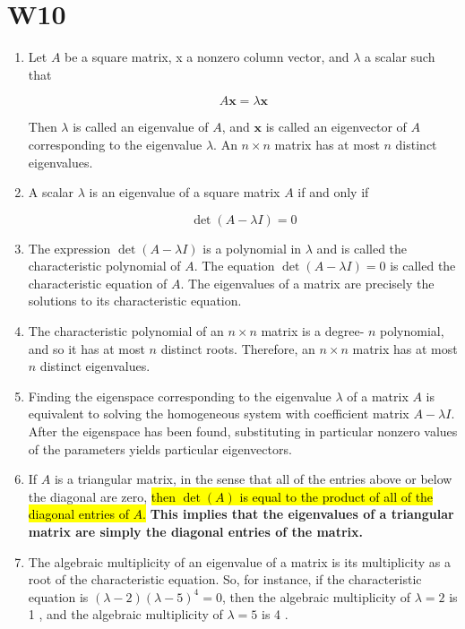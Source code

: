 \documentclass[10pt]{article}
\begin{document}
\section{W10}
\begin{enumerate}
\item Let $A$ be a square matrix, x a nonzero column vector, and $\lambda$ a scalar such that

$$
A \mathbf{x}=\lambda \mathbf{x}
$$

Then $\lambda$ is called an eigenvalue of $A$, and $\mathbf{x}$ is called an eigenvector of $A$ corresponding to the eigenvalue $\lambda$. An $n \times n$ matrix has at most $n$ distinct eigenvalues.

\item A scalar $\lambda$ is an eigenvalue of a square matrix $A$ if and only if

$$
\operatorname{det}(A-\lambda I)=0
$$

\item The expression $\operatorname{det}(A-\lambda I)$ is a polynomial in $\lambda$ and is called the characteristic polynomial of $A$. The equation $\operatorname{det}(A-\lambda I)=0$ is called the characteristic equation of $A$. The eigenvalues of a matrix are precisely the solutions to its characteristic equation.

\item The characteristic polynomial of an $n \times n$ matrix is a degree- $n$ polynomial, and so it has at most $n$ distinct roots. Therefore, an $n \times n$ matrix has at most $n$ distinct eigenvalues.

\item Finding the eigenspace corresponding to the eigenvalue $\lambda$ of a matrix $A$ is equivalent to solving the homogeneous system with coefficient matrix $A-\lambda I$. After the eigenspace has been found, substituting in particular nonzero values of the parameters yields particular eigenvectors.

\item If $A$ is a triangular matrix, in the sense that all of the entries above or below the diagonal are zero, \hl{then $\operatorname{det}(A)$ is equal to the product of all of the diagonal entries of $A$. }\textbf{This implies that the eigenvalues of a triangular matrix are simply the diagonal entries of the matrix.}

\item The algebraic multiplicity of an eigenvalue of a matrix is its multiplicity as a root of the characteristic equation. So, for instance, if the characteristic equation is $(\lambda-2)(\lambda-5)^{4}=0$, then the algebraic multiplicity of $\lambda=2$ is 1 , and the algebraic multiplicity of $\lambda=5$ is 4 .


\end{enumerate}
\end{document}
